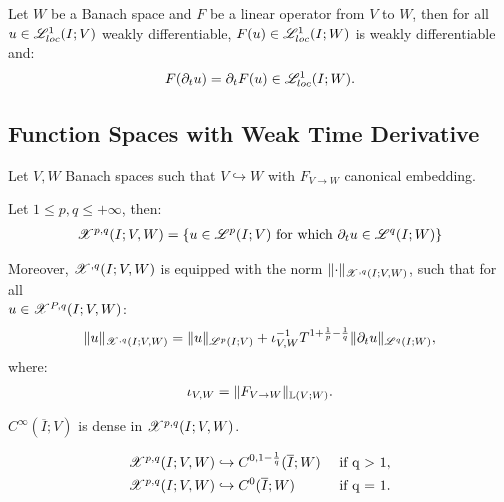 \begin{lemma}
    Let $W$ be a Banach space and $F$ be a linear operator from $V$ to $W$, then for all $u \in \mathscr{L}^{1}_{loc}(I; V)$ weakly differentiable, $F(u) \in \mathscr{L}^{1}_{loc}(I; W)$ is weakly differentiable and:
    \begin{align}
        F(\partial_t u) = \partial_t F(u) \in \mathscr{L}^{1}_{loc}(I; W).
    \end{align}
\end{lemma}

\newpage
\subsection{Function Spaces with Weak Time Derivative}

Let $V, W$ Banach spaces such that $V \hookrightarrow W$ with $F_{V \rightarrow W}$ canonical embedding.

\begin{definition}[$\SpaceXpq{p}{q}(I; V, W)$]
    Let $1 \leq p, q \leq +\infty$, then:
    \begin{align}
        \mathscr{X}^{p, q}(I; V, W) = \left\{ u \in \mathscr{L}^{p}(I; V) \text{ for which } \partial_t u \in \mathscr{L}^{q}(I; W) \right\}
    \end{align}

    Moreover, $\mathscr{X}^{, q}(I; V, W)$ is equipped with the norm $\lVert \cdot \rVert_{\mathscr{X}^{, q}(I; V, W)}$, such that for all \\ $u \in \mathscr{X}^{P, q}(I; V, W)$:
    \begin{align}
        \lVert u \rVert_{\mathscr{X}^{, q}(I; V, W)} = \lVert u \rVert_{\mathscr{L}^{p}(I; V)} + \iota_{V, W}^{-1}T^{1 + \frac{1}{p} - \frac{1}{q}} \lVert \partial_t u \rVert_{\mathscr{L}^{q}(I; W)},
    \end{align}
    where:
    \begin{align}
        \iota_{V, W} = \lVert F_{V \rightarrow W} \rVert_{\mathbb{L}(V;W)}.
    \end{align}
\end{definition}

\begin{theorem}
    $C^{\infty}(\overline{I}; V)$ is dense in $\SpaceXpq{p}{q}(I; V, W)$.
\end{theorem}

\begin{lemma}
    \begin{align}
        & \mathscr{X}^{p, q}(I; V, W) \hookrightarrow C^{0, 1 - \frac{1}{q}}(\overline{I}; W) & \text{ if q > 1}, \\
        & \mathscr{X}^{p, q}(I; V, W) \hookrightarrow C^{0}(\overline{I}; W) & \text{ if q = 1}.
    \end{align}
\end{lemma}


